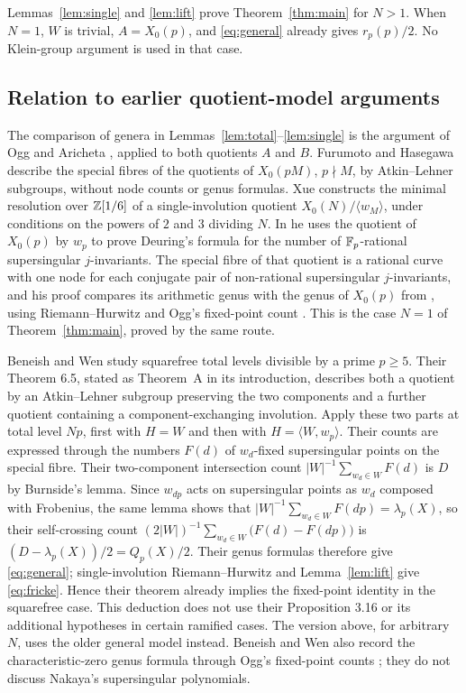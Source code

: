 \documentclass[11pt,a4paper]{article}
\theoremstyle{remark}\newtheorem{remark}[theorem]{Remark}
\numberwithin{equation}{section}
\begin{document}
	Lemmas~\ref{lem:single} and \ref{lem:lift} prove Theorem~\ref{thm:main} for $N>1$. When $N=1$, $W$ is trivial, $A=X_0(p)$, and \eqref{eq:general} already gives $r_p(p)/2$. No Klein-group argument is used in that case.
	
	\subsection{Relation to earlier quotient-model arguments}\label{sec:prior}
	The comparison of genera in Lemmas~\ref{lem:total}--\ref{lem:single} is the argument of Ogg \cite{OggRed} and Aricheta \cite[Theorem 3.1]{Aricheta}, applied to both quotients $A$ and $B$. Furumoto and Hasegawa \cite[Section 5]{FH} describe the special fibres of the quotients of $X_0(pM)$, $p\nmid M$, by Atkin--Lehner subgroups, without node counts or genus formulas. Xue \cite{Xue} constructs the minimal resolution over $\mathbb Z[1/6]$ of a single-involution quotient $X_0(N)/\langle w_M\rangle$, under conditions on the powers of $2$ and $3$ dividing $N$. In \cite[Section 7.1, Theorem 2]{Xue} he uses the quotient of $X_0(p)$ by $w_p$ to prove Deuring's formula for the number of $\mathbb F_p$-rational supersingular $j$-invariants. The special fibre of that quotient is a rational curve with one node for each conjugate pair of non-rational supersingular $j$-invariants, and his proof compares its arithmetic genus with the genus of $X_0(p)$ from \cite[VI, Theorem 6.9]{DR}, using Riemann--Hurwitz and Ogg's fixed-point count \cite[p.~454]{Ogg}. This is the case $N=1$ of Theorem~\ref{thm:main}, proved by the same route.
	
	
	Beneish and Wen \cite{BW} study squarefree total levels divisible by a prime $p\geq5$. Their Theorem 6.5, stated as Theorem~A in its introduction, describes both a quotient by an Atkin--Lehner subgroup preserving the two components and a further quotient containing a component-exchanging involution. Apply these two parts at total level $Np$, first with $H=W$ and then with $H=\langle W,w_p\rangle$. Their counts are expressed through the numbers $F(d)$ of $w_d$-fixed supersingular points on the special fibre. Their two-component intersection count $|W|^{-1}\sum_{w_d\in W}F(d)$ is $D$ by Burnside's lemma. Since $w_{dp}$ acts on supersingular points as $w_d$ composed with Frobenius, the same lemma shows that $|W|^{-1}\sum_{w_d\in W}F(dp)=\lambda_p(X)$, so their self-crossing count $(2|W|)^{-1}\sum_{w_d\in W}\bigl(F(d)-F(dp)\bigr)$ is $(D-\lambda_p(X))/2=Q_p(X)/2$. Their genus formulas therefore give \eqref{eq:general}; single-involution Riemann--Hurwitz and Lemma~\ref{lem:lift} give \eqref{eq:fricke}. Hence their theorem already implies the fixed-point identity in the squarefree case. This deduction does not use their Proposition 3.16 or its additional hypotheses in certain ramified cases. The version above, for arbitrary $N$, uses the older general model instead. Beneish and Wen also record the characteristic-zero genus formula through Ogg's fixed-point counts \cite[Remark 6.6]{BW}; they do not discuss Nakaya's supersingular polynomials.
	
\end{document}
